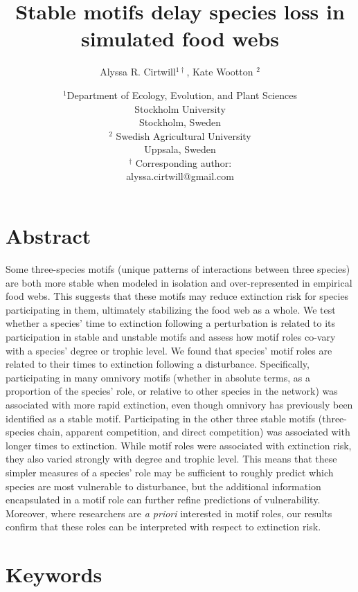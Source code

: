 \documentclass[12pt]{article}
\title{Stable motifs delay species loss in simulated food webs}
\author{Alyssa R. Cirtwill$^{1\dagger}$, Kate Wootton $^{2}$}
\date{\small$^1$Department of Ecology, Evolution, and Plant Sciences\\ 
Stockholm University\\
Stockholm, Sweden\\
\medskip
\small$^2$ Swedish Agricultural University\\
Uppsala, Sweden\\
\medskip
$^\dagger$ Corresponding author:\\
alyssa.cirtwill@gmail.com\\
 }
\begin{document}
 
\maketitle 
\raggedright
\setlength{\parindent}{15pt} 

\clearpage
\linenumbers
\begin{spacing}{2.0}

\section*{Abstract} %
    Some three-species motifs (unique patterns of interactions between three species) are both more stable when modeled in isolation and over-represented in empirical food webs. This suggests that these motifs may reduce extinction risk for species participating in them, ultimately stabilizing the food web as a whole. 
    We test whether a species' time to extinction following a perturbation is related to its participation in stable and unstable motifs and assess how motif roles co-vary with a species' degree or trophic level.
    We found that species' motif roles are related to their times to extinction following a disturbance. Specifically, participating in many omnivory motifs (whether in absolute terms, as a proportion of the species' role, or relative to other species in the network) was associated with more rapid extinction, even though omnivory has previously been identified as a stable motif. Participating in the other three stable motifs (three-species chain, apparent competition, and direct competition) was associated with longer times to extinction.
    While motif roles were associated with extinction risk, they also varied strongly with degree and trophic level. This means that these simpler measures of a species' role may be sufficient to roughly predict which species are most vulnerable to disturbance, but the additional information encapsulated in a motif role can further refine predictions of vulnerability. Moreover, where researchers are \emph{a priori} interested in motif roles, our results confirm that these roles can be interpreted with respect to extinction risk.%

\section*{Keywords}


\end{spacing}
\end{document}
